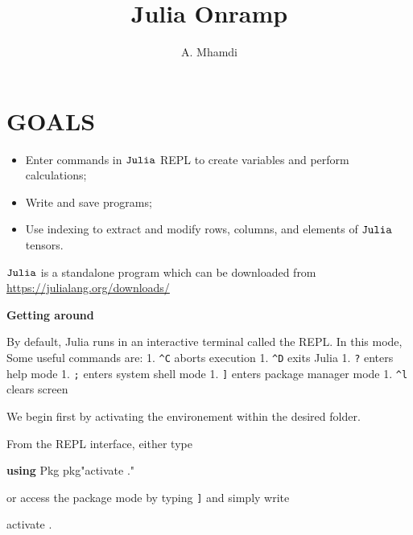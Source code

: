 \documentclass[11pt]{article}
\title{Julia Onramp}
\author{A. Mhamdi}
\providecommand{\tightlist}{%
      \setlength{\itemsep}{0pt}\setlength{\parskip}{0pt}}
\newenvironment{Shaded}{}{}
\newcommand{\KeywordTok}[1]{\textcolor[rgb]{0.00,0.44,0.13}{\textbf{{#1}}}}
\newcommand{\StringTok}[1]{\textcolor[rgb]{0.25,0.44,0.63}{{#1}}}
\newcommand{\NormalTok}[1]{{#1}}
\begin{document}
    
    \maketitle
    
    

  

    \hypertarget{goals}{%
\section{GOALS}\label{goals}}

\begin{itemize}
\tightlist
\item
  Enter commands in \({\tt Julia}\) REPL to create variables and perform
  calculations;
\item
  Write and save programs;
\item
  Use indexing to extract and modify rows, columns, and elements of
  \({\tt Julia}\) tensors.
\end{itemize}

    \({\tt Julia}\) is a standalone program which can be downloaded from
\url{https://julialang.org/downloads/}

    \textbf{Getting around}

    By default, Julia runs in an interactive terminal called the REPL. In
this mode, Some useful commands are: 1. \texttt{\^{}C} aborts execution
1. \texttt{\^{}D} exits Julia 1. \texttt{?} enters help mode 1.
\texttt{;} enters system shell mode 1. \texttt{{]}} enters package
manager mode 1. \texttt{\^{}l} clears screen

    We begin first by activating the environement within the desired folder.

    From the REPL interface, either type

\begin{Shaded}
\begin{Highlighting}[]
\KeywordTok{using}\NormalTok{ Pkg  }
\NormalTok{pkg}\StringTok{"activate ."}
\end{Highlighting}
\end{Shaded}

or access the package mode by typing \texttt{{]}} and simply write

\begin{Shaded}
\begin{Highlighting}[]
\NormalTok{activate .}
\end{Highlighting}
\end{Shaded}
\end{document}
